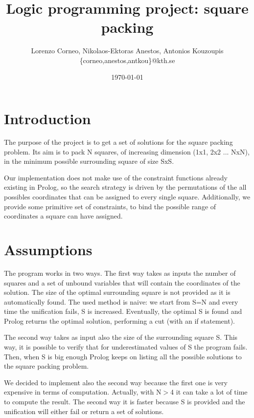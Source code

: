 \documentclass{article}[10pt]
\begin{document}
\title{Logic programming project: square packing}
\author{Lorenzo Corneo, Nikolaos-Ektoras Anestos, Antonios Kouzoupis \\
	\{corneo,anestos,antkou\}@kth.se}
\date{\today}
\maketitle

\section{Introduction}

The purpose of the project is to get a set of solutions for the square packing problem. Its aim is to pack N squares, of increasing dimension (1x1, 2x2 ... NxN), in the minimum possible surrounding square of size SxS.

Our implementation does not make use of the constraint functions already existing in Prolog, so the search strategy is driven by the permutations of the all possibles coordinates that can be assigned to every single square. Additionally, we provide some primitive set of constraints, to bind the possible range of coordinates a square can have assigned.

\section{Assumptions}

The program works in two ways. The first way takes as inputs the number of squares and a set of unbound variables that will contain the coordinates of the solution. The size of the optimal surrounding square is not provided as it is automatically found. The used method is naive: we start from S=N and every time the unification fails, S is increased. Eventually, the  optimal S is found and Prolog returns the optimal solution, performing a cut (with an if statement).

The second way takes as input also the size of the surrounding square S. This way, it is possible to verify that for underestimated values of S the program fails. Then, when S is big enough Prolog keeps on listing all the possible solutions to the square packing problem.

We decided to implement also the second way because the first one is very expensive in terms of computation. Actually, with N$>$4 it can take a lot of time to compute the result. The second way it is faster because S is provided and the unification will either fail or return a set of solutions.
\end{document}
